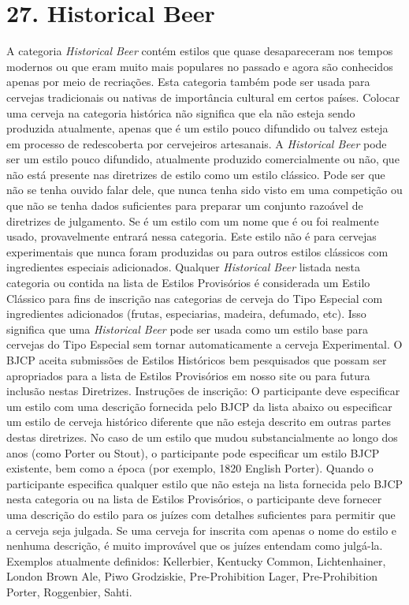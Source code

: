 \section*{27. Historical Beer}

A categoria \textit{Historical Beer} contém estilos que quase desapareceram nos tempos modernos ou que eram muito mais populares no passado e agora são conhecidos apenas por meio de recriações. Esta categoria também pode ser usada para cervejas tradicionais ou nativas de importância cultural em certos países. Colocar uma cerveja na categoria histórica não significa que ela não esteja sendo produzida atualmente, apenas que é um estilo pouco difundido ou talvez esteja em processo de redescoberta por cervejeiros artesanais.
A \textit{Historical Beer} pode ser um estilo pouco difundido, atualmente produzido comercialmente ou não, que não está presente nas diretrizes de estilo como um estilo clássico. Pode ser que não se tenha ouvido falar dele, que nunca tenha sido visto em uma competição ou que não se tenha dados suficientes para preparar um conjunto razoável de diretrizes de julgamento. Se é um estilo com um nome que é ou foi realmente usado, provavelmente entrará nessa categoria. Este estilo não é para cervejas experimentais que nunca foram produzidas ou para outros estilos clássicos com ingredientes especiais adicionados.
Qualquer \textit{Historical Beer} listada nesta categoria ou contida na lista de Estilos Provisórios é considerada um Estilo Clássico para fins de inscrição nas categorias de cerveja do Tipo Especial com ingredientes adicionados (frutas, especiarias, madeira, defumado, etc). Isso significa que uma \textit{Historical Beer} pode ser usada como um estilo base para cervejas do Tipo Especial sem tornar automaticamente a cerveja Experimental. O BJCP aceita submissões de Estilos Históricos bem pesquisados que possam ser apropriados para a lista de Estilos Provisórios em nosso site ou para futura inclusão nestas Diretrizes.
Instruções de inscrição: O participante deve especificar um estilo com uma descrição fornecida pelo BJCP da lista abaixo ou especificar um estilo de cerveja histórico diferente que não esteja descrito em outras partes destas diretrizes. No caso de um estilo que mudou substancialmente ao longo dos anos (como Porter ou Stout), o participante pode especificar um estilo BJCP existente, bem como a época (por exemplo, 1820 English Porter).
Quando o participante especifica qualquer estilo que não esteja na lista fornecida pelo BJCP nesta categoria ou na lista de Estilos Provisórios, o participante deve fornecer uma descrição do estilo para os juízes com detalhes suficientes para permitir que a cerveja seja julgada. Se uma cerveja for inscrita com apenas o nome do estilo e nenhuma descrição, é muito improvável que os juízes entendam como julgá-la.
Exemplos atualmente definidos: Kellerbier, Kentucky Common, Lichtenhainer, London Brown Ale, Piwo Grodziskie, Pre-Prohibition Lager, Pre-Prohibition Porter, Roggenbier, Sahti.

